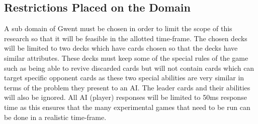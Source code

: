 \documentclass [11pt]{article}
\begin{document}
	\subsection{Restrictions Placed on the Domain}
	A sub domain of Gwent must be chosen in order to limit the scope of this research so that it will be feasible in the allotted time-frame. The chosen decks will be limited to two decks which have cards chosen so that the decks have similar attributes. These decks must keep some of the special rules of the game such as being able to revive discarded cards but will not contain cards which can target specific opponent cards as these two special abilities are very similar in terms of the problem they present to an AI. The leader cards and their abilities will also be ignored. All AI (player) responses will be limited to 50ms response time as this ensures that the many experimental games that need to be run can be done in a realistic time-frame.
	
\end{document}
